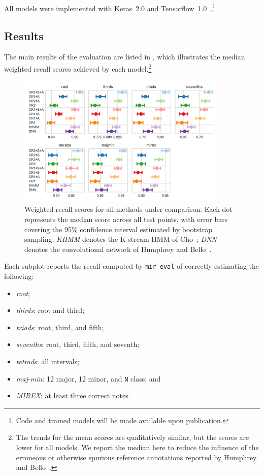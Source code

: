 \documentclass{article}
\begin{document}

All models were implemented with Keras~2.0 and Tensorflow~1.0~\cite{chollet2015keras, tensorflow2015-whitepaper}.\footnote{Code and trained models will be made available upon publication.}

\subsection{Results}

The main results of the evaluation are listed in , which illustrates the median weighted recall scores achieved by each model.\footnote{The trends for the mean scores are qualitatively similar, but the scores are lower for all models. We report the median here to reduce the influence of the erroneous or otherwise spurious reference annotations reported by Humphrey and Bello~\cite{humphrey2015four}.}
\begin{figure}[t]
    \centering
    \includegraphics[width=0.9\textwidth]{crnn-scores}
    \caption{Weighted recall scores for all methods under comparison.  Each dot represents the median score across all test points, with error bars covering the 95\% confidence interval estimated by bootstrap sampling.
        \emph{KHMM} denotes the K-stream HMM of Cho~\cite{cho2014improved}; \emph{DNN} denotes the convolutional network of Humphrey and Bello~\cite{humphrey2015four}.\label{fig:results}}
\end{figure}
Each subplot reports the recall computed by \texttt{mir\_eval} of correctly estimating the following:
\begin{itemize}
    \item \emph{root};
    \item \emph{thirds}: root and third;
    \item \emph{triads}: root, third, and fifth;
    \item \emph{sevenths}: root, third, fifth, and seventh;
    \item \emph{tetrads}: all intervals;
    \item \emph{maj-min}: 12 major, 12 minor, and \texttt{N} class; and
    \item \emph{MIREX}: at least three correct notes.
\end{itemize}
\end{document}
